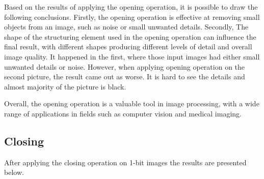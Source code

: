 \documentclass[12pt]{article}
\begin{document}
Based on the results of applying the opening operation, it is possible to draw the following conclusions. Firstly, the opening operation is effective at removing small objects from an image, such as noise or small unwanted details. Secondly, The shape of the structuring element used in the opening operation can influence the final result, with different shapes producing different levels of detail and overall image quality. It happened in the first, where those input images had either small unwanted details or noise. However, when applying opening operation on the second picture, the result came out as worse. It is hard to see the details and almost majority of the picture is black. 

Overall, the opening operation is a valuable tool in image processing, with a wide range of applications in fields such as computer vision and medical imaging.

\subsection{Closing}

After applying the closing operation on 1-bit images the results are presented below.
\end{document}
